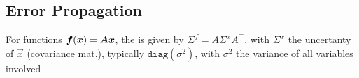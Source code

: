 \subsection{Error Propagation}
\label{sec:error-propagation}
For functions $\bm{f}(\bm{x}) = \bm{A}\bm{x}$, the 
is given by $\Sigma^f = A \Sigma^x A^\top$, with $\Sigma^x$ the uncertanty of $\vec{x}$ (covariance mat.), typically $\texttt{diag}(\sigma^2)$,
with $\sigma^2$ the variance of all variables involved
